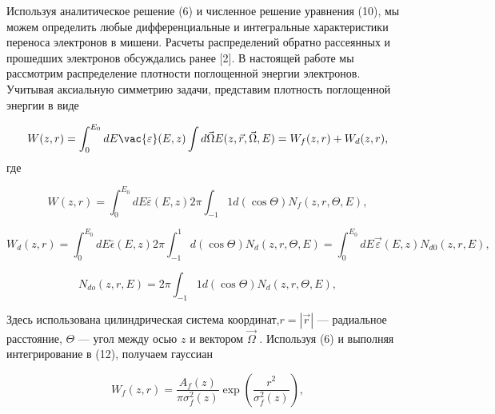Используя аналитическое решение (6) и численное решение уравнения (10), мы
можем определить любые дифференциальные и интегральные характеристики переноса
электронов в мишени. Расчеты распределений обратно рассеянных и прошедших
электронов обсуждались ранее [2]. В настоящей работе мы рассмотрим распределение
плотности поглощенной энергии электронов.
Учитывая аксиальную симметрию задачи, представим плотность поглощенной
энергии в виде

\begin{equation}
W(z,r)=\int_{0}^{E_0} dE\vac{\varepsilon}(E,z) \int d\vec{\Omega}E(z,\vec{r},\vec{\Omega},E)=W_f(z,r)+W_d(z,r),
\label{eq:11}
\end{equation}
где

\begin{equation}
W(z,r)=\int_{0}^{E_0} dE\bar{\varepsilon}(E,z)2\pi \int_{-1}{1} d(\cos \Theta)N_f(z,r,\Theta ,E),
\label{eq:12}
\end{equation}

\begin{equation}
W_{d}(z,r)=\int_{0}^{E_0} dE\bar{\epsilon}(E,z)2\pi \int_{-1}^{1} d(\cos \Theta)N_d(z,r,\Theta ,E)=\int_{0}^{E_0}dE\vec{\varepsilon}(E,z)N_{d0}(z,r,E),
\label{eq:13}
\end{equation}

\begin{equation}
N_{do}(z,r,E)=2\pi \int_{-1}{1} d(\cos \Theta)N_d(z,r,\Theta,E),
\label{eq:14}
\end{equation}

Здесь использована цилиндрическая система координат,$r=|\vec{r}|$
— радиальное
расстояние, $\Theta$ — угол между осью $z$ и вектором $\vec{\Omega}$ .
Используя (6) и выполняя интегрирование в (12), получаем гауссиан

\begin{equation}
W_f(z,r)=\frac{A_f(z)}{\pi \sigma_f^2(z)} \exp \left(\frac{r^2}{\sigma_f^2(z)}\right),
\label{eq:15}
\end{equation}

